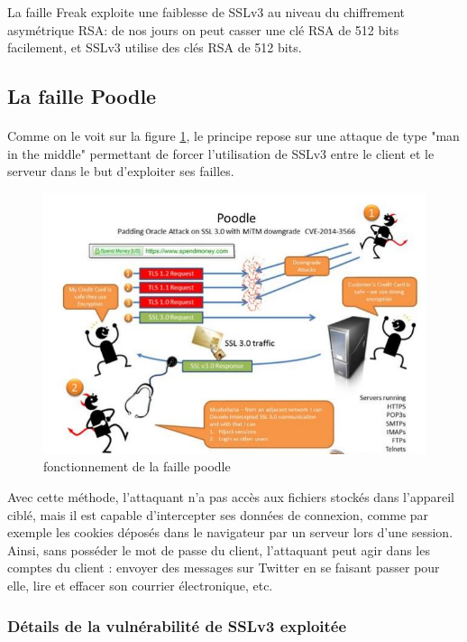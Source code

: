 La faille Freak exploite une faiblesse de SSLv3 au niveau du chiffrement asymétrique RSA: de nos jours on peut casser une clé RSA de 512 bits facilement, et SSLv3 utilise des clés RSA de 512 bits.

\subsection{La faille Poodle}
\paragraph{}
Comme on le voit sur la figure \ref{poodle}, le principe repose sur une attaque de type "man in the middle" permettant de forcer l'utilisation de SSLv3 entre le client et le serveur dans le but d'exploiter ses failles. 

\begin{figure}[H]
\centering
\includegraphics[scale=0.9]{img/poodle.jpg}
\caption{fonctionnement de la faille poodle}
\label{poodle}
\end{figure}

Avec cette méthode, l'attaquant n’a pas accès aux fichiers stockés dans l’appareil ciblé, mais il est capable d'intercepter ses données de connexion, comme par exemple les cookies déposés dans le navigateur par un serveur lors d’une session. Ainsi, sans posséder le mot de passe du client, l'attaquant peut agir dans les comptes du client : envoyer des messages sur Twitter en se faisant passer pour elle, lire et effacer son courrier électronique, etc.

\subsubsection{Détails de la vulnérabilité de SSLv3 exploitée}

